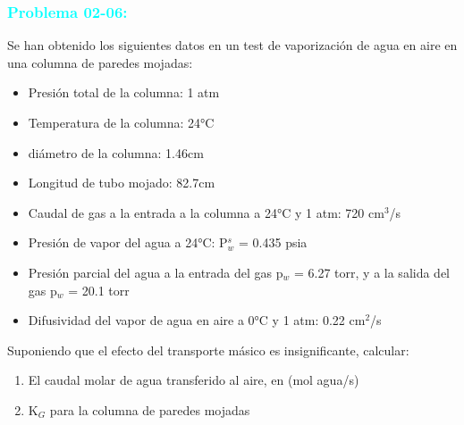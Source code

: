 \documentclass{report}
\begin{document}
\subsubsection{\textbf{\textcolor{cyan}{Problema 02-06:}}}
\begin{raggedright}
Se han obtenido los siguientes datos en un test de vaporización de agua en aire en una columna de paredes mojadas:
\begin{itemize}
	\item Presión total de la columna: 1 atm
	\item Temperatura de la columna: 24°C
	\item diámetro de la columna: 1.46cm 
	\item Longitud de tubo mojado: 82.7cm
	\item Caudal de gas a la entrada a la columna a 24°C y 1 atm: 720 cm$^3$/s
	\item Presión de vapor del agua a 24°C: P$^s_w$ = 0.435 psia
	\item Presión parcial del agua a la entrada del gas p$_w$ = 6.27 torr, y a la salida del gas p$_w$ = 20.1 torr
	\item Difusividad del vapor de agua en aire a 0°C y 1 atm: 0.22 cm$^2$/s
\end{itemize}
Suponiendo que el efecto del  transporte másico es insignificante, calcular:
\begin{enumerate}[label=\textbf{\alph*)}]
	\item El caudal molar de agua transferido al aire, en (mol agua/s)
	\item K$_G$ para la columna de paredes mojadas
\end{enumerate}
\end{raggedright}
\end{document}
